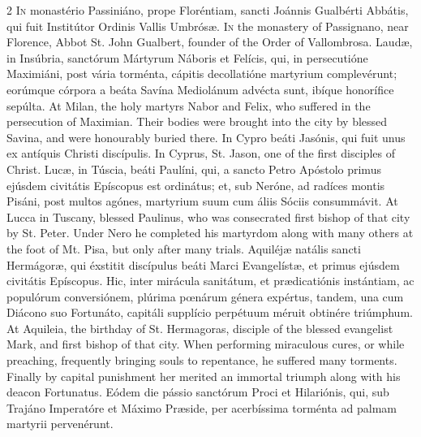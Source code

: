 \begin{paracol}{2}
\lettrine[lines=2]{I}{n} monastério 
 Passiniáno, prope Floréntiam, sancti Joánnis Gualbérti Abbátis, qui fuit 
 Institútor Ordinis Vallis Umbrósæ.
\switchcolumn
{}
\lettrine[lines=2]{I}{n} the monastery of Passignano, near 
 Florence, Abbot St. John Gualbert, founder of the Order of Vallombrosa.
\switchcolumn*
{}
Laudæ, in Insúbria, 
 sanctórum Mártyrum Náboris et Felícis, qui, in persecutióne Maximiáni, post 
 vária torménta, cápitis decollatióne martyrium complevérunt; eorúmque 
 córpora a beáta Savína Mediolánum advécta sunt, ibíque honorífice sepúlta.
\switchcolumn
{}
At Milan, the holy martyrs Nabor and 
 Felix, who suffered in the persecution of Maximian. Their bodies were 
 brought into the city by blessed Savina, and were honourably buried there.
\switchcolumn*
{}
In Cypro beáti Jasónis, 
 qui fuit unus ex antíquis Christi discípulis.
\switchcolumn
{}
In Cyprus, St. Jason, one of the 
 first disciples of Christ.
\switchcolumn*
{}
Lucæ, in Túscia, beáti 
 Paulíni, qui, a sancto Petro Apóstolo primus ejúsdem civitátis Epíscopus est 
 ordinátus; et, sub Neróne, ad radíces montis Pisáni, post multos agónes, 
 martyrium suum cum áliis Sóciis consummávit.
\switchcolumn
{}
At Lucca in Tuscany, blessed 
 Paulinus, who was consecrated first bishop of that city by St. Peter. 
 Under Nero he completed his martyrdom along with many others at the foot of 
 Mt. Pisa, but only after many trials.
\switchcolumn*
{}
Aquiléjæ natális sancti 
 Hermágoræ, qui éxstitit discípulus beáti Marci Evangelístæ, et primus 
 ejúsdem civitátis Epíscopus. Hic, inter mirácula sanitátum, et 
 prædicatiónis instántiam, ac populórum conversiónem, plúrima pœnárum génera 
 expértus, tandem, una cum Diácono suo Fortunáto, capitáli supplício 
 perpétuum méruit obtinére triúmphum.
\switchcolumn
{}
At Aquileia, the birthday of St. 
 Hermagoras, disciple of the blessed evangelist Mark, and first bishop of 
 that city. When performing miraculous cures, or while preaching, 
 frequently bringing souls to repentance, he suffered many torments. 
 Finally by capital punishment her merited an immortal triumph along with his 
 deacon Fortunatus.
\switchcolumn*
{}
Eódem die pássio 
 sanctórum Proci et Hilariónis, qui, sub Trajáno Imperatóre et Máximo Præside, 
 per acerbíssima torménta ad palmam martyrii pervenérunt.

\end{paracol}
